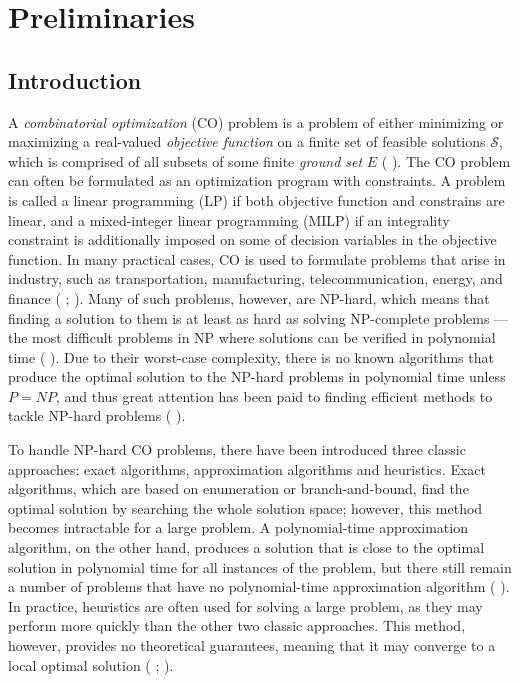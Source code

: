 \part{Preliminaries}
\chapter{Introduction}
\label{chap:intro}
\vspace{1cm}

A \textit{combinatorial optimization} (CO) problem is a problem of either minimizing or maximizing a real-valued \textit{objective function} on a finite set of feasible solutions $\mathcal{S}$, which is comprised of all subsets of some finite \textit{ground set} $E$ (\citeauthor{lee_2004} \cite{lee_2004}). The CO problem can often be formulated as an optimization program with constraints. A problem is called a linear programming (LP) if both objective function and constrains are linear, and a mixed-integer linear programming (MILP) if an integrality constraint is additionally imposed on some of decision variables in the objective function. In many practical cases, CO is used to formulate problems that arise in industry, such as transportation, manufacturing, telecommunication, energy, and finance (\citeauthor{bengio2018machine} \cite{bengio2018machine}; \citeauthor{lee_2004} \cite{lee_2004}). Many of such problems, however, are NP-hard, which means that finding a solution to them is at least as hard as solving NP-complete problems --- the most difficult problems in NP where solutions can be verified in polynomial time (\citeauthor{paarsch2016gentle} \cite{paarsch2016gentle}). Due to their worst-case complexity, there is no known algorithms that produce the optimal solution to the NP-hard problems in polynomial time unless $P = NP$, and thus great attention has been paid to finding efficient methods to tackle NP-hard problems (\citeauthor{barrett2019exploratory} \cite{barrett2019exploratory}). %

To handle NP-hard CO problems, there have been introduced three classic approaches: exact algorithms, approximation algorithms and heuristics. Exact algorithms, which are based on enumeration or branch-and-bound, find the optimal solution by searching the whole solution space; however, this method becomes intractable for a large problem. A polynomial-time approximation algorithm, on the other hand, produces a solution that is close to the optimal solution in polynomial time for all instances of the problem, but there still remain a number of problems that have no polynomial-time approximation algorithm (\citeauthor{williamson2011design} \cite{williamson2011design}). In practice,  heuristics are often used for solving a large problem, as they may perform more quickly than the other two classic approaches. This method, however, provides no theoretical guarantees, meaning that it may converge to a local optimal solution (\citeauthor{barrett2019exploratory} \cite{barrett2019exploratory}; \citeauthor{williamson2011design} \cite{williamson2011design}).


